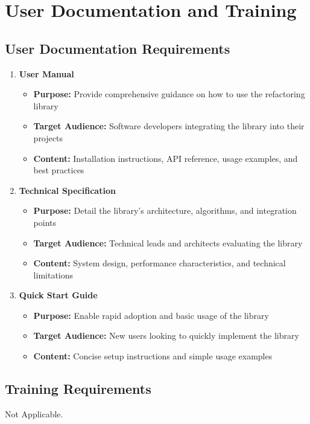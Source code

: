 \documentclass[12pt]{article}
\begin{document}
\section{User Documentation and Training}
\subsection{User Documentation Requirements}
\begin{enumerate}
  \item \textbf{User Manual}
  \begin{itemize}
      \item \textbf{Purpose:} Provide comprehensive guidance on how to use the refactoring library
      \item \textbf{Target Audience:} Software developers integrating the library into their projects
      \item \textbf{Content:} Installation instructions, API reference, usage examples, and best practices
  \end{itemize}

  \item \textbf{Technical Specification}
  \begin{itemize}
      \item \textbf{Purpose:} Detail the library's architecture, algorithms, and integration points
      \item \textbf{Target Audience:} Technical leads and architects evaluating the library
      \item \textbf{Content:} System design, performance characteristics, and technical limitations
  \end{itemize}

  \item \textbf{Quick Start Guide}
  \begin{itemize}
      \item \textbf{Purpose:} Enable rapid adoption and basic usage of the library
      \item \textbf{Target Audience:} New users looking to quickly implement the library
      \item \textbf{Content:} Concise setup instructions and simple usage examples
  \end{itemize}
\end{enumerate}

\subsection{Training Requirements}
Not Applicable.
\end{document}

